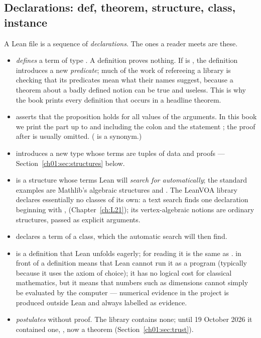 \subsection{Declarations: def, theorem, structure, class, instance}

A Lean file is a sequence of \emph{declarations}. The ones a reader meets are these.
\begin{itemize}
\item {} \emph{defines} a term of type . A definition
  proves nothing. If  is , the definition introduces a new \emph{predicate}; much
  of the work of refereeing a library is checking that its predicates mean what their names
  suggest, because a theorem about a badly defined notion can be true and useless. This is why the
  book prints every definition that occurs in a headline theorem.
\item {} asserts that the proposition  holds for
  all values of the arguments. In this book we print the part up to and including the colon and the
  statement ; the proof after \lean{:=} is usually omitted. ( is a synonym.)
\item {} introduces a new type whose terms are tuples of data and proofs ---
  Section~\ref{ch01:sec:structures} below.
\item {} is a structure whose terms Lean will \emph{search for automatically}; the
  standard examples are Mathlib's algebraic structures  and
  . The LeanVOA library declares essentially no classes of its own: a text search finds one
  declaration beginning with , 
  (Chapter~\ref{ch:L21}); its vertex-algebraic notions are ordinary structures, passed as explicit
  arguments.
\item {} declares a term of a class, which the automatic search will then find.
\item {} is a definition that Lean unfolds eagerly; for reading it is the same as
  .  in front of a definition means that Lean cannot run it as a
  program (typically because it uses the axiom of choice); it has no logical cost for classical
  mathematics, but it means that numbers such as dimensions cannot simply be evaluated by the
  computer --- numerical evidence in the project is produced outside Lean and always labelled as
  evidence.
\item {} \emph{postulates}  without proof. The library contains none;
  until 19 October 2026 it contained one, , now a theorem
  (Section~\ref{ch01:sec:trust}).
\end{itemize}

